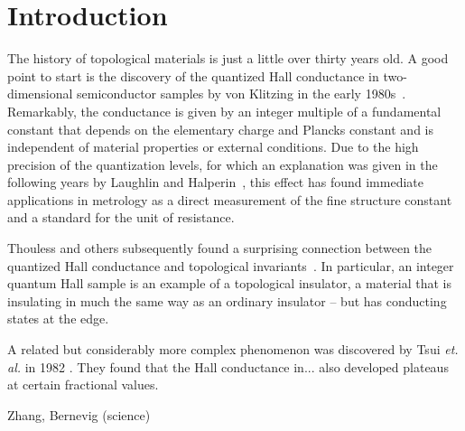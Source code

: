\chapter*{Introduction}


The history of topological materials is just a little over thirty years old.
A good point to start is the discovery of the quantized Hall conductance in two-dimensional semiconductor samples by von Klitzing in the early 1980s~\cite{Klitzing1980,Klitzing1992}.
Remarkably, the conductance is given by an integer multiple of a fundamental constant that depends on the elementary charge and Plancks constant and is independent of material properties or external conditions.
Due to the high precision of the quantization levels, for which an explanation was given in the following years by Laughlin and Halperin~\cite{Laughlin1981,Halperin1982}, this effect has found immediate applications in metrology as a direct measurement of the fine structure constant and a standard for the unit of resistance.

Thouless and others subsequently found a surprising connection between the quantized Hall conductance and topological invariants~\cite{Thouless1982,Niu1985,Kohmoto1985,Kohmoto1989,Bellissard1994}.
In particular, an integer quantum Hall sample is an example of a topological insulator, a material that is insulating in much the same way as an ordinary insulator -- but has conducting states at the edge.

A related but considerably more complex phenomenon was discovered by Tsui \emph{et. al.} in 1982 \cite{Tsui1982}.
They found that the Hall conductance in... also developed plateaus at certain fractional values.

\cite{Haldane1988}

\cite{Kitaev2003}

\cite{Kane2005a,Kane2005,Hasan2010}

Zhang, Bernevig (science)

\cite{Willett1987}

